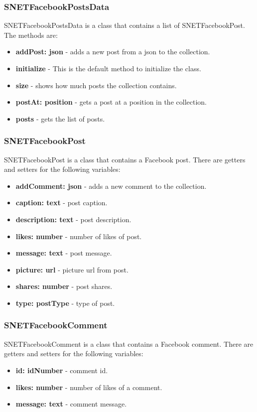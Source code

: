 \subsubsection{SNETFacebookPostsData}
\label{sec-1-5-3}
SNETFacebookPostsData is a class that contains a list of SNETFacebookPost. The methods are:
\begin{itemize}
\item \textbf{addPost: json} - adds a new post from a json to the collection.
\item \textbf{initialize} - This is the default method to initialize the class.
\item \textbf{size} - shows how much posts the collection contains.
\item \textbf{postAt: position} - gets a post at a position in the collection.
\item \textbf{posts} - gets the list of posts.
\end{itemize}

\subsubsection{SNETFacebookPost}
\label{sec-1-5-4}
SNETFacebookPost is a class that contains a Facebook post. There are getters and setters for the following variables:
\begin{itemize}
\item \textbf{addComment: json} - adds a new comment to the collection.
\item \textbf{caption: text} - post caption.
\item \textbf{description: text} - post description.
\item \textbf{likes: number} - number of likes of post.
\item \textbf{message: text} - post message.
\item \textbf{picture: url} - picture url from post.
\item \textbf{shares: number} - post shares.
\item \textbf{type: postType} - type of post.
\end{itemize}


\subsubsection{SNETFacebookComment}
\label{sec-1-5-5}
SNETFacebookComment is a class that contains a Facebook comment. There are getters and setters for the following variables:
\begin{itemize}
\item \textbf{id: idNumber} - comment id.
\item \textbf{likes: number} - number of likes of a comment.
\item \textbf{message: text} - comment message.
\end{itemize}


